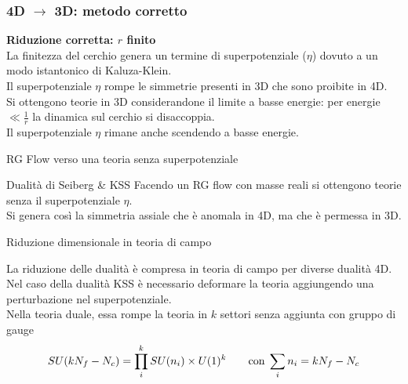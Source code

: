 \documentclass[10pt,compress]{beamer}
\begin{document}
\begin{frame}[fragile]
\frametitle{4D $\longrightarrow $ 3D: metodo corretto}
\begin{center}
{\Large \bfseries Riduzione corretta: $r$ finito}\\
\vspace{0.5cm}
La finitezza del cerchio genera un termine di superpotenziale ($\eta$) dovuto a un modo istantonico di Kaluza-Klein.\\
\vspace{0.3cm}
Il superpotenziale $\eta$ rompe le simmetrie presenti in 3D che sono proibite in 4D.\\
\vspace{0.3cm}
Si ottengono teorie in 3D considerandone il limite a basse energie:
per energie $\ll \frac{1}{r}$ la dinamica sul cerchio si disaccoppia. 
\\
\vspace{0.3cm}
Il superpotenziale $\eta$ rimane anche scendendo  a basse energie.
\end{center}
\end{frame}





\begin{frame}{RG Flow verso una teoria senza superpotenziale}
\begin{block}{Dualità di Seiberg \& KSS}
Facendo un RG flow con masse reali si ottengono teorie senza il superpotenziale $\eta$.\\
\vspace{1cm}
Si genera così la simmetria assiale che è anomala in 4D, ma che è permessa in 3D.
\end{block}

\end{frame}




\begin{frame}{Riduzione dimensionale in teoria di campo}

La riduzione delle dualità è compresa in teoria di campo per diverse dualità 4D.\\
\vspace{0.3cm}
Nel caso della dualità KSS
è necessario deformare la teoria aggiungendo una perturbazione nel superpotenziale. \\
\vspace{0.3cm}
Nella teoria duale, essa rompe la teoria in $k$ settori senza aggiunta con gruppo di gauge 
$$
SU(k N_f - N_c)  = \prod_i^k SU(n_i) \times U(1)^k
\qquad \hbox{con} \; \sum_i n_i = k N_f - N_c
$$
\end{frame}
\end{document}
